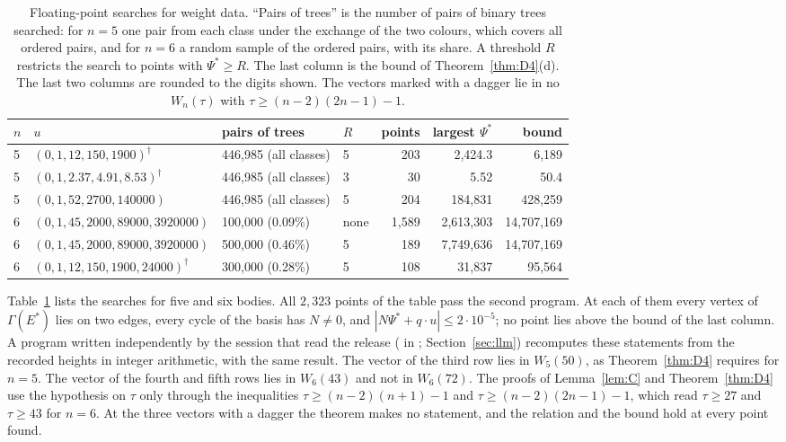 \documentclass[11pt]{amsart}
\theoremstyle{definition}
\theoremstyle{remark}
\numberwithin{equation}{section}
\newcommand{\repo}[1]{\texttt{\detokenize{#1}}}
\newcommand{\Ps}{\Psi^{*}}
\newcommand{\Es}{E^{*}}
\begin{document}
\begin{table}[ht]
\caption{Floating-point searches for weight data. ``Pairs of trees'' is the number of pairs of binary
trees searched: for $n = 5$ one pair from each class under the exchange of the two colours, which
covers all ordered pairs, and for $n = 6$ a random sample of the ordered pairs, with its share. A
threshold $R$ restricts the search to points with $\Ps \ge R$. The last column is the bound of
Theorem~\ref{thm:D4}(d). The last two columns are rounded to the digits shown. The vectors marked
with a dagger lie in no $W_n(\tau)$ with $\tau \ge (n - 2)(2n - 1) - 1$.}\label{tab:comp}
\footnotesize
\setlength{\tabcolsep}{4pt}
\begin{tabular}{@{}l>{\raggedright}p{}>{\raggedright}p{}lrrr@{}}
\toprule
$n$ & $u$ & pairs of trees & $R$ & points & largest $\Ps$ & bound \\
\midrule
5 & $(0, 1, 12, 150, 1900)^{\dagger}$ & 446,985 (all classes) & 5 & 203 & 2,424.3 & 6,189 \\
5 & $(0, 1, 2.37, 4.91, 8.53)^{\dagger}$ & 446,985 (all classes) & 3 & 30 & 5.52 & 50.4 \\
5 & $(0, 1, 52, 2700, 140000)$ & 446,985 (all classes) & 5 & 204 & 184,831 & 428,259 \\
6 & $(0, 1, 45, 2000, 89000, 3920000)$ & 100,000 (0.09\%) & none & 1,589 & 2,613,303 & 14,707,169 \\
6 & $(0, 1, 45, 2000, 89000, 3920000)$ & 500,000 (0.46\%) & 5 & 189 & 7,749,636 & 14,707,169 \\
6 & $(0, 1, 12, 150, 1900, 24000)^{\dagger}$ & 300,000 (0.28\%) & 5 & 108 & 31,837 & 95,564 \\
\bottomrule
\end{tabular}
\end{table}

Table~\ref{tab:comp} lists the searches for five and six bodies. All $2{,}323$ points of the
table pass the second program. At each of them every vertex of $\Gamma(\Es)$ lies on two edges, every
cycle of the basis has $N \ne 0$, and $|N\Ps + q \cdot u| \le 2 \cdot 10^{-5}$; no point lies above the
bound of the last column. A program written independently by the session that read the release
(\repo{independent_points.py} in \repo{data/n7/allN/hier/r34}; Section~\ref{sec:llm}) recomputes
these statements from the recorded heights in integer arithmetic, with the same result. The vector of the third row lies in $W_5(50)$, as Theorem~\ref{thm:D4} requires for $n = 5$.
The vector of the fourth and fifth rows lies in $W_6(43)$ and not in $W_6(72)$. The proofs of
Lemma~\ref{lem:C} and Theorem~\ref{thm:D4} use the hypothesis on $\tau$ only through the inequalities
$\tau \ge (n - 2)(n + 1) - 1$ and $\tau \ge (n - 2)(2n - 1) - 1$, which read $\tau \ge 27$ and
$\tau \ge 43$ for $n = 6$. At the three vectors with a dagger the theorem makes no statement, and the
relation and the bound hold at every point found.
\end{document}
